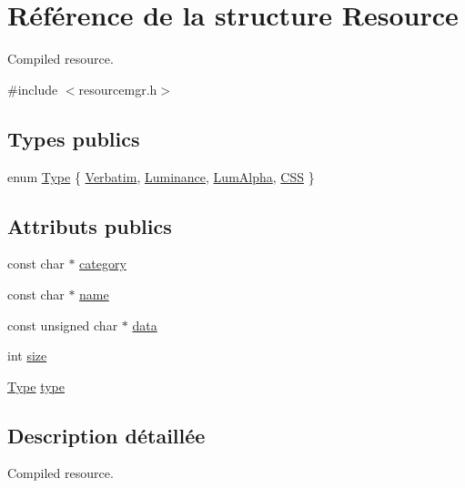 \hypertarget{struct_resource}{}\section{Référence de la structure Resource}
\label{struct_resource}


Compiled resource.  




{\ttfamily \#include $<$resourcemgr.\+h$>$}

\subsection*{Types publics}
\begin{DoxyCompactItemize}
\item 
enum \hyperlink{struct_resource_abde5e686869a8c7241557d18033b382e}{Type} \{ \hyperlink{struct_resource_abde5e686869a8c7241557d18033b382eaf197aa4cab57b5ab94f906de74015e27}{Verbatim}, 
\hyperlink{struct_resource_abde5e686869a8c7241557d18033b382ea2299c5780439f9fdb61c832e9fcbc242}{Luminance}, 
\hyperlink{struct_resource_abde5e686869a8c7241557d18033b382ead65c2cc7ea99cfab02ab5f4ef4663229}{Lum\+Alpha}, 
\hyperlink{struct_resource_abde5e686869a8c7241557d18033b382ea29ef0680eea5f373388c8ead45694fd7}{C\+S\+S}
 \}
\end{DoxyCompactItemize}
\subsection*{Attributs publics}
\begin{DoxyCompactItemize}
\item 
const char $\ast$ \hyperlink{struct_resource_a8bbbf27d6106005f06d12e1489457188}{category}
\item 
const char $\ast$ \hyperlink{struct_resource_a0695b8faedc32497170802bea7cf8ac7}{name}
\item 
const unsigned char $\ast$ \hyperlink{struct_resource_ac5775d3448fb9ed16c0ec90dbed87a71}{data}
\item 
int \hyperlink{struct_resource_a0f8739be95e0d934239663ea7551060b}{size}
\item 
\hyperlink{struct_resource_abde5e686869a8c7241557d18033b382e}{Type} \hyperlink{struct_resource_ae73282ad08d3c990c8a0ff353e231ab3}{type}
\end{DoxyCompactItemize}


\subsection{Description détaillée}
Compiled resource. 

